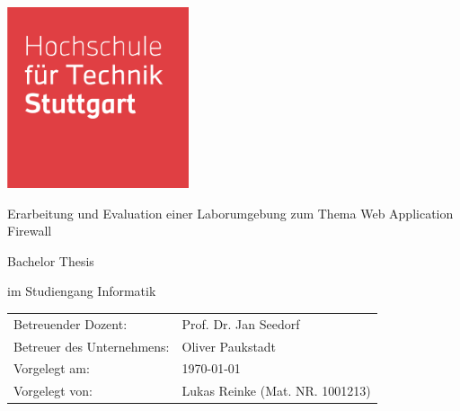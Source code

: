 \begin{titlepage}
    \includegraphics[width=0.4\textwidth]{images/HFT_logo}
    \centering
    \vspace{1.5cm}
    {\par \LARGE Erarbeitung und Evaluation einer Laborumgebung zum Thema Web Application Firewall\par}
    \vspace{1cm}
    {\par \large Bachelor Thesis\par}
    {\par \large im Studiengang Informatik\par}
    \vfill
    \begin{table}[!hbt]
        \centering
        \begin{tabular}{ll}
            Betreuender Dozent:         & Prof. Dr. Jan Seedorf           \\
            Betreuer des Unternehmens:  & Oliver Paukstadt                \\
            Vorgelegt am:               & \today                          \\
            Vorgelegt von:              & Lukas Reinke (Mat. NR. 1001213)
        \end{tabular}\label{tab:info}
    \end{table}
\end{titlepage}